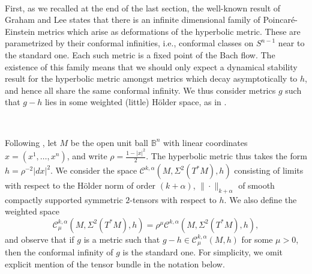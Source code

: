 \documentclass[10pt,reqno]{amsart}
\begin{document}
\

First, as we recalled at the end of the last section, the well-known result of Graham and Lee \cite{GL} states that there is an infinite dimensional family of Poincar\'e-Einstein metrics 
which arise as deformations of the hyperbolic metric. These are parametrized by their conformal infinities, i.e., conformal classes on $S^{n-1}$ 
near to the standard one. Each such metric is a fixed point of the Bach flow.  The existence of this family means that we should only expect a dynamical stability result for
the hyperbolic metric amongst metrics which decay asymptotically to $h$, and hence all share the same conformal infinity. We thus consider metrics $g$ such that $g-h$
lies in some weighted (little) H\"older space, as in \cite{BGIM2, BGIM}.

\

Following \cite{BGIM2}, let $M$ be the open unit ball $\mathbb{B}^n$ with linear coordinates $x = (x^1, \ldots, x^n)$, and write $\rho = \frac{1-|x|^2}{2}$.  
The hyperbolic metric thus takes the form $h = \rho^{-2} |dx|^2$.  We consider the space $\mathcal C^{k,\alpha}(M, \Sigma^2(T^*M),h)$ consisting of 
limits with respect to the H\"older norm of order $(k+\alpha)$, $\|\cdot\|_{k+\alpha}$ of smooth compactly supported symmetric $2$-tensors with respect to $h$.  We also define the weighted space
\begin{equation}
\label{wghtd norm def}
\mathcal C^{k,\alpha}_{\mu}(M, \Sigma^2(T^*M), h) = \rho^{\mu} \mathcal C^{k,\alpha}(M,\Sigma^2(T^*M), h),
\end{equation}
and observe that if $g$ is a metric such that $g - h \in \mathcal C^{k,\alpha}_{\mu}(M,h)$ for some $\mu > 0$, then the conformal infinity of $g$ is the
standard one.   For simplicity, we omit explicit mention of the tensor bundle in the notation below. 

\
\end{document}
